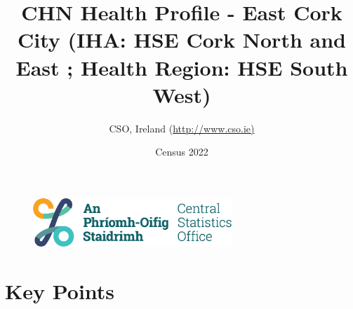 \documentclass{article}
\title{CHN Health Profile - East Cork City (IHA: HSE Cork North and East ;  Health Region: HSE South West) }
\date{Census 2022}
\author{CSO, Ireland  (\url{http://www.cso.ie)}}
\begin{document}


\begin{figure}
	\centering
\includegraphics[width =75mm]{../figures/CSO_Logo.png}
\end{figure}

				 
		   
						  
														  
																																													
												 
			 
\maketitle
					
													   
				 
						 
																																																																											   
				 
				  
  \pagebreak
    	    \tableofcontents

\pagebreak


\section{Key Points}
\end{document}
